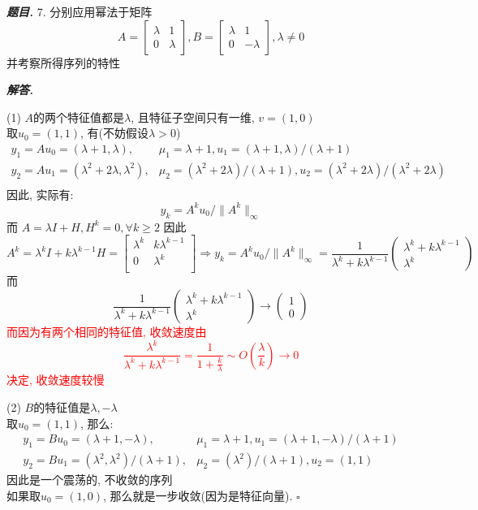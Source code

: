 \documentclass[10pt, a4paper, oneside]{ctexart}
\newcommand{\norm}[1]{\| #1 \|}
\newenvironment{problem}{\begin{framed}\par\noindent\textbf{\textit{题目. }}}{\end{framed}\par}
\newenvironment{solution}{%
  \par\noindent\textbf{\textit{解答. }}\ignorespaces
}{%
  \hfill\ensuremath{\square}\par %
}
\begin{document}
\begin{problem}
7. 分别应用幂法于矩阵
$$A=\begin{bmatrix}
    \lambda&1\\
    0&\lambda
\end{bmatrix}, B=\begin{bmatrix}
    \lambda&1\\
    0&-\lambda
\end{bmatrix} ,\lambda \neq 0$$
并考察所得序列的特性
\end{problem}
\begin{solution}
(1) $A$的两个特征值都是$\lambda$, 且特征子空间只有一维, $v=(1,0)$\\
取$u_0=(1,1)$, 有(不妨假设$\lambda>0$) 
\begin{align*}
    y_1=Au_0=(\lambda+1,\lambda),& \mu_1=\lambda+1, u_1=(\lambda+1,\lambda)/(\lambda+1)\\
    y_2=Au_1=(\lambda^2+2\lambda,\lambda^2),& \mu_2=(\lambda^2+2\lambda)/(\lambda+1), u_2=(\lambda^2+2\lambda)/(\lambda^2+2\lambda)\\
\end{align*}
因此, 实际有: 
$$y_k=A^ku_0/\norm{A^k}_{\infty}$$
而 
$A=\lambda I +H, H^k=0, \forall k\geq 2$
因此 
$$A^k=\lambda^k I +k\lambda^{k-1}H=\begin{bmatrix}
    \lambda^k&k\lambda^{k-1}\\
    0&\lambda^{k}\\
\end{bmatrix}\Rightarrow y_k=A^ku_0/\norm{A^k}_{\infty}=\frac{1}{\lambda^k+k\lambda^{k-1}}\begin{pmatrix}
    \lambda^k+k\lambda^{k-1}\\
    \lambda^k
\end{pmatrix}$$
而 
$$\frac{1}{\lambda^k+k\lambda^{k-1}}\begin{pmatrix}
    \lambda^k+k\lambda^{k-1}\\
    \lambda^k
\end{pmatrix}\to \begin{pmatrix}
    1\\0
\end{pmatrix}$$
\textcolor{red}{而因为有两个相同的特征值, 收敛速度由
$$\frac{\lambda^k}{\lambda^k+k\lambda^{k-1}}=\frac{1}{1+\frac{k}{\lambda}}\sim O(\frac{\lambda}{k})\to 0$$
决定, 收敛速度较慢}

(2) $B$的特征值是$\lambda, -\lambda$\\
取$u_0=(1,1)$, 那么:
\begin{align*}
    y_1=Bu_0=(\lambda+1,-\lambda), &\mu_1=\lambda+1, u_1=(\lambda+1,-\lambda)/(\lambda+1)\\
    y_2=Bu_1=(\lambda^2,\lambda^2)/(\lambda+1), &\mu_2=(\lambda^2)/(\lambda+1), u_2=(1,1)
\end{align*}
因此是一个震荡的, 不收敛的序列\\
如果取$u_0=(1,0)$, 那么就是一步收敛(因为是特征向量).
\end{solution}
\end{document}
